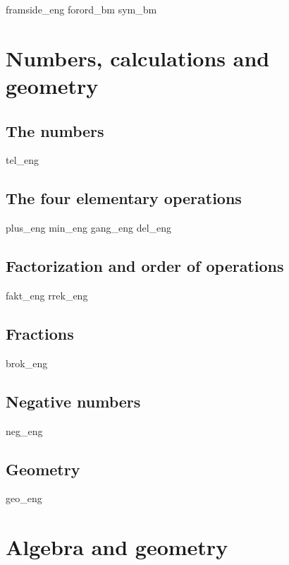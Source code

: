 




{framside_eng}
{forord_bm}
{sym_bm}
\newpage

{\footnotesize \tableofcontents}
\newpage
\part{Numbers, calculations and geometry \label{Del1}}

\chapter{The numbers \label{Talavare}}
\newpage
{tel_eng}
%
\chapter{The four elementary operations \label{Rekneartane}}
\newpage
{plus_eng}
{min_eng}
{gang_eng}
{del_eng}
\chapter{Factorization and order of operations}
\newpage
{fakt_eng}
{rrek_eng}

\chapter{Fractions}
\newpage
{brok_eng}

\chapter{Negative numbers \label{Negtal}}
\newpage
{neg_eng}


\chapter{Geometry}
\newpage
{geo_eng}

\part{Algebra and geometry \label{Del2}}
